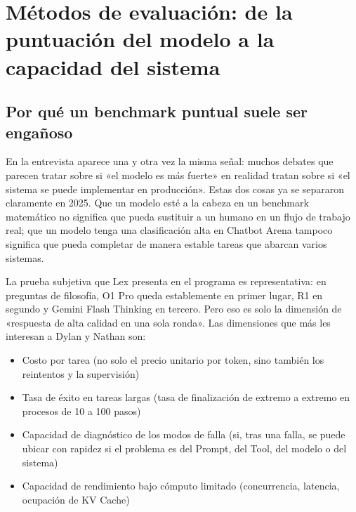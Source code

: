 \section{Métodos de evaluación: de la puntuación del modelo a la capacidad del sistema}

\subsection{Por qué un benchmark puntual suele ser engañoso}

En la entrevista aparece una y otra vez la misma señal: muchos debates que parecen tratar sobre si «el modelo es más fuerte» en realidad tratan sobre si «el sistema se puede implementar en producción». Estas dos cosas ya se separaron claramente en 2025. Que un modelo esté a la cabeza en un benchmark matemático no significa que pueda sustituir a un humano en un flujo de trabajo real; que un modelo tenga una clasificación alta en Chatbot Arena tampoco significa que pueda completar de manera estable tareas que abarcan varios sistemas.

La prueba subjetiva que Lex presenta en el programa es representativa: en preguntas de filosofía, O1 Pro queda establemente en primer lugar, R1 en segundo y Gemini Flash Thinking en tercero. Pero eso es solo la dimensión de «respuesta de alta calidad en una sola ronda». Las dimensiones que más les interesan a Dylan y Nathan son:
\begin{itemize}
    \item Costo por tarea (no solo el precio unitario por token, sino también los reintentos y la supervisión)
    \item Tasa de éxito en tareas largas (tasa de finalización de extremo a extremo en procesos de 10 a 100 pasos)
    \item Capacidad de diagnóstico de los modos de falla (si, tras una falla, se puede ubicar con rapidez si el problema es del Prompt, del Tool, del modelo o del sistema)
    \item Capacidad de rendimiento bajo cómputo limitado (concurrencia, latencia, ocupación de KV Cache)
\end{itemize}

